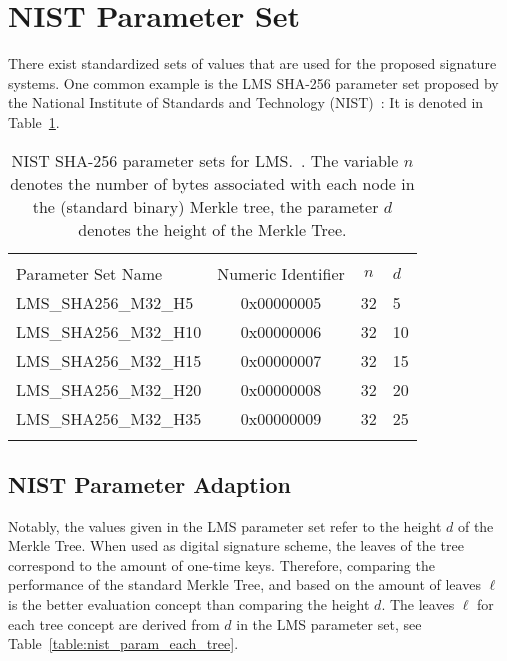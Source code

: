 \section{NIST Parameter Set}
There exist standardized sets of values that are used for the proposed signature systems. One common example is the LMS SHA-256 parameter set proposed by the National Institute of Standards and Technology (NIST)~\cite{stateful_hashbased_sign_schemes_NIST_2020}: It is denoted in Table~\ref{table:nist_param_lms}. 

\begin{table}
\centering
\begin{tabular}{l c c l} 
 \hline\noalign{\smallskip}
 \multicolumn{4}{c}{\textbf{LMS Parameter Sets: NIST}} \\
 Parameter Set Name & Numeric Identifier & $n$ & $d$\\
 \hline\noalign{\smallskip}
 LMS\_SHA256\_M32\_H5 & 0x00000005  & 32 & 5 \\
 LMS\_SHA256\_M32\_H10 & 0x00000006  & 32 & 10 \\
 LMS\_SHA256\_M32\_H15 & 0x00000007  & 32 & 15 \\
 LMS\_SHA256\_M32\_H20 & 0x00000008  & 32 & 20 \\
 LMS\_SHA256\_M32\_H35 & 0x00000009  & 32 & 25 \\
 \hline\noalign{\smallskip}
 \end{tabular}
\caption{NIST SHA-256 parameter sets for LMS.~\cite{stateful_hashbased_sign_schemes_NIST_2020}. The variable $n$ denotes the number of bytes associated with each node in the (standard binary) Merkle tree, the parameter $d$ denotes the height of the Merkle Tree.}
\label{table:nist_param_lms}
\end{table}

\subsection{NIST Parameter Adaption}
\label{sec:nist_param_to_leaves}
Notably, the values given in the LMS parameter set refer to the height $d$ of the Merkle Tree. When used as digital signature scheme, the leaves of the tree correspond to the amount of one-time keys. Therefore, comparing the performance of the standard Merkle Tree, \tftree and \extree based on the amount of leaves $\ell$ is the better evaluation concept than comparing the height $d$. 
The leaves $\ell$ for each tree concept are derived from $d$ in the LMS parameter set, see Table~\ref{table:nist_param_each_tree}. 

